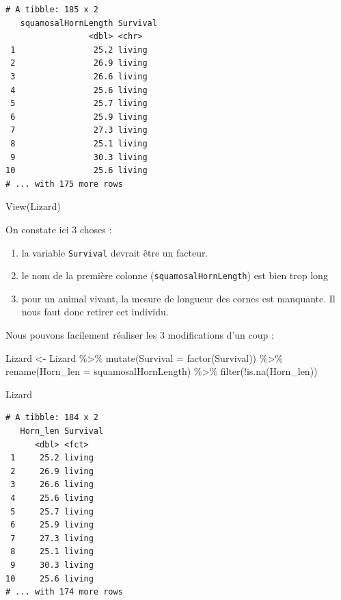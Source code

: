 \documentclass[
  a4paper,
]{article}
\newenvironment{Shaded}{\begin{snugshade}}{\end{snugshade}}
\newcommand{\AttributeTok}[1]{\textcolor[rgb]{0.00,0.34,0.68}{#1}}
\newcommand{\FunctionTok}[1]{\textcolor[rgb]{0.39,0.29,0.61}{#1}}
\newcommand{\NormalTok}[1]{\textcolor[rgb]{0.12,0.11,0.11}{#1}}
\newcommand{\OtherTok}[1]{\textcolor[rgb]{0.00,0.43,0.16}{#1}}
\newcommand{\SpecialCharTok}[1]{\textcolor[rgb]{0.24,0.68,0.91}{#1}}
\providecommand{\tightlist}{%
  \setlength{\itemsep}{0pt}\setlength{\parskip}{0pt}}
\begin{document}
\begin{verbatim}
# A tibble: 185 x 2
   squamosalHornLength Survival
                 <dbl> <chr>   
 1                25.2 living  
 2                26.9 living  
 3                26.6 living  
 4                25.6 living  
 5                25.7 living  
 6                25.9 living  
 7                27.3 living  
 8                25.1 living  
 9                30.3 living  
10                25.6 living  
# ... with 175 more rows
\end{verbatim}

\begin{Shaded}
\begin{Highlighting}[]
\FunctionTok{View}\NormalTok{(Lizard)}
\end{Highlighting}
\end{Shaded}

On constate ici 3 choses :

\begin{enumerate}
\def\labelenumi{\arabic{enumi}.}
\tightlist
\item
  la variable \texttt{Survival} devrait être un facteur.
\item
  le nom de la première colonne (\texttt{squamosalHornLength}) est bien trop long
\item
  pour un animal vivant, la mesure de longueur des cornes est manquante. Il nous faut donc retirer cet individu.
\end{enumerate}

Nous pouvons facilement réaliser les 3 modifications d'un coup :

\begin{Shaded}
\begin{Highlighting}[]
\NormalTok{Lizard }\OtherTok{\textless{}{-}}\NormalTok{ Lizard }\SpecialCharTok{\%\textgreater{}\%} 
  \FunctionTok{mutate}\NormalTok{(}\AttributeTok{Survival =} \FunctionTok{factor}\NormalTok{(Survival)) }\SpecialCharTok{\%\textgreater{}\%} 
  \FunctionTok{rename}\NormalTok{(}\AttributeTok{Horn\_len =}\NormalTok{ squamosalHornLength) }\SpecialCharTok{\%\textgreater{}\%} 
  \FunctionTok{filter}\NormalTok{(}\SpecialCharTok{!}\FunctionTok{is.na}\NormalTok{(Horn\_len))}

\NormalTok{Lizard}
\end{Highlighting}
\end{Shaded}

\begin{verbatim}
# A tibble: 184 x 2
   Horn_len Survival
      <dbl> <fct>   
 1     25.2 living  
 2     26.9 living  
 3     26.6 living  
 4     25.6 living  
 5     25.7 living  
 6     25.9 living  
 7     27.3 living  
 8     25.1 living  
 9     30.3 living  
10     25.6 living  
# ... with 174 more rows
\end{verbatim}
\end{document}
